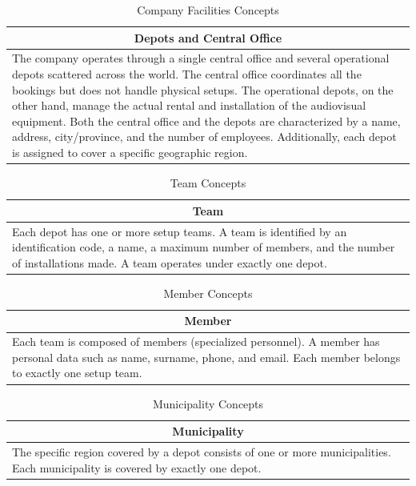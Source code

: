 \documentclass[12pt]{article}
\begin{document}
\begin{table}[H] 
\renewcommand{\arraystretch}{1.3} 
\begin{tabularx}{\textwidth}{|X|} 
\hline \multicolumn{1}{|c|}{\textbf{Depots and Central Office}} \\ \hline 
The company operates through a single central office and several operational depots scattered across the world. The central office coordinates all the bookings but does not handle physical setups. The operational depots, on the other hand, manage the actual rental and installation of the audiovisual equipment. Both the central office and the depots are characterized by a name, address, city/province, and the number of employees. Additionally, each depot is assigned to cover a specific geographic region. \\ \hline 
\end{tabularx} 
\caption{Company Facilities Concepts} 
\end{table} 

\begin{table}[H] 
\renewcommand{\arraystretch}{1.3} 
\begin{tabularx}{\textwidth}{|X|} 
\hline \multicolumn{1}{|c|}{\textbf{Team}} \\ \hline 
Each depot has one or more setup teams. A team is identified by an identification code, a name, a maximum number of members, and the number of installations made. A team operates under exactly one depot. \\ \hline 
\end{tabularx} 
\caption{Team Concepts} 
\end{table} 

\begin{table}[H] 
\renewcommand{\arraystretch}{1.3} 
\begin{tabularx}{\textwidth}{|X|} 
\hline \multicolumn{1}{|c|}{\textbf{Member}} \\ \hline 
Each team is composed of members (specialized personnel). A member has personal data such as name, surname, phone, and email. Each member belongs to exactly one setup team. \\ \hline 
\end{tabularx} 
\caption{Member Concepts} 
\end{table} 

\begin{table}[H] 
\renewcommand{\arraystretch}{1.3} 
\begin{tabularx}{\textwidth}{|X|} 
\hline \multicolumn{1}{|c|}{\textbf{Municipality}} \\ \hline 
The specific region covered by a depot consists of one or more municipalities. Each municipality is covered by exactly one depot. \\ \hline 
\end{tabularx} 
\caption{Municipality Concepts} 
\end{table} 
\end{document}
